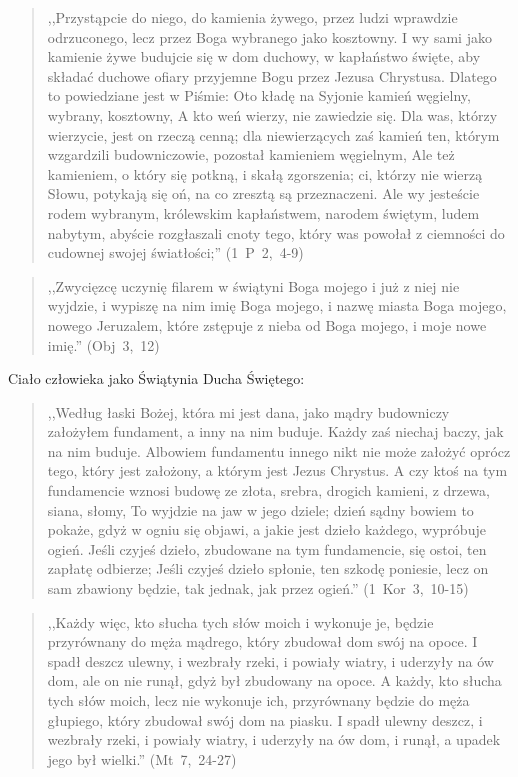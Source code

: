 \documentclass[10pt,a4paper,oneside]{article}
\begin{document}
\begin{quote}
,,Przystąpcie do niego, do kamienia żywego, przez ludzi wprawdzie odrzuconego, lecz przez Boga wybranego jako kosztowny. I wy sami jako kamienie żywe budujcie się w dom duchowy, w kapłaństwo święte, aby składać duchowe ofiary przyjemne Bogu przez Jezusa Chrystusa. Dlatego to powiedziane jest w Piśmie: Oto kładę na Syjonie kamień węgielny, wybrany, kosztowny, A kto weń wierzy, nie zawiedzie się. Dla was, którzy wierzycie, jest on rzeczą cenną; dla niewierzących zaś kamień ten, którym wzgardzili budowniczowie, pozostał kamieniem węgielnym, Ale też kamieniem, o który się potkną, i skałą zgorszenia; ci, którzy nie wierzą Słowu, potykają się oń, na co zresztą są przeznaczeni. Ale wy jesteście rodem wybranym, królewskim kapłaństwem, narodem świętym, ludem nabytym, abyście rozgłaszali cnoty tego, który was powołał z ciemności do cudownej swojej światłości;'' \mbox{(1 P 2, 4-9)}
\end{quote}
\begin{quote}
,,Zwycięzcę uczynię filarem w świątyni Boga mojego i już z niej nie wyjdzie, i wypiszę na nim imię Boga mojego, i nazwę miasta Boga mojego, nowego Jeruzalem, które zstępuje z nieba od Boga mojego, i moje nowe imię.'' \mbox{(Obj 3, 12)}
\end{quote}
Ciało człowieka jako Świątynia Ducha Świętego:
\begin{quote}
,,Według łaski Bożej, która mi jest dana, jako mądry budowniczy założyłem fundament, a inny na nim buduje. Każdy zaś niechaj baczy, jak na nim buduje. Albowiem fundamentu innego nikt nie może założyć oprócz tego, który jest założony, a którym jest Jezus Chrystus. A czy ktoś na tym fundamencie wznosi budowę ze złota, srebra, drogich kamieni, z drzewa, siana, słomy, To wyjdzie na jaw w jego dziele; dzień sądny bowiem to pokaże, gdyż w ogniu się objawi, a jakie jest dzieło każdego, wypróbuje ogień. Jeśli czyjeś dzieło, zbudowane na tym fundamencie, się ostoi, ten zapłatę odbierze; Jeśli czyjeś dzieło spłonie, ten szkodę poniesie, lecz on sam zbawiony będzie, tak jednak, jak przez ogień.'' \mbox{(1 Kor 3, 10-15)}
\end{quote}
\begin{quote}
,,Każdy więc, kto słucha tych słów moich i wykonuje je, będzie przyrównany do męża mądrego, który zbudował dom swój na opoce. I spadł deszcz ulewny, i wezbrały rzeki, i powiały wiatry, i uderzyły na ów dom, ale on nie runął, gdyż był zbudowany na opoce. A każdy, kto słucha tych słów moich, lecz nie wykonuje ich, przyrównany będzie do męża głupiego, który zbudował swój dom na piasku. I spadł ulewny deszcz, i wezbrały rzeki, i powiały wiatry, i uderzyły na ów dom, i runął, a upadek jego był wielki.'' \mbox{(Mt 7, 24-27)}
\end{quote}
\end{document}
